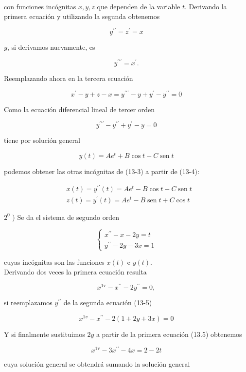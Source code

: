 \documentclass[10pt]{article}
\theoremstyle{plain}
\theoremstyle{definition}
\theoremstyle{remark}
\begin{document}
con funciones incógnitas $x, y, z$ que dependen de la variable $t$. Derivando la primera ecuación y utilizando la segunda obtenemos


\begin{equation*}
y^{\prime \prime}=z^{\prime}=x \tag{13-4}
\end{equation*}


$y$, si derivamos nuevamente, es

$$
y^{\prime \prime \prime}=x^{\prime} .
$$

Reemplazando ahora en la tercera ecuación

$$
x^{\prime}-y+z-x=y^{\prime \prime \prime}-y+y^{\prime}-y^{\prime \prime}=0
$$

Como la ecuación diferencial lineal de tercer orden

$$
y^{\prime \prime \prime}-y^{\prime \prime}+y^{\prime}-y=0
$$

tiene por solución general

$$
y(t)=A e^{t}+B \cos t+C \operatorname{sen} t
$$

podemos obtener las otras incógnitas de (13-3) a partir de (13-4):

$$
\begin{aligned}
& x(t)=y^{\prime \prime}(t)=A e^{t}-B \cos t-C \operatorname{sen} t \\
& z(t)=y^{\prime}(t)=A e^{t}-B \operatorname{sen} t+C \cos t
\end{aligned}
$$

$2^{0}$ ) Se da el sistema de segundo orden

\[
\left\{\begin{array}{l}
x^{\prime \prime}-x-2 y=t  \tag{13-5}\\
y^{\prime \prime}-2 y-3 x=1
\end{array}\right.
\]

cuyas incógnitas son las funciones $x(t)$ e $y(t)$.\\
Derivando dos veces la primera ecuación resulta

$$
x^{1 \mathrm{v}}-x^{\prime \prime}-2 y^{\prime \prime}=0,
$$

si reemplazamos $y^{\prime \prime}$ de la segunda ecuación (13-5)


$$
x^{1 v}-x^{\prime \prime}-2(1+2 y+3 x)=0
$$

Y si finalmente sustituimos $2 y$ a partir de la primera ecuación (13.5) obtenemos

$$
x^{1 \mathrm{v}}-3 x^{\prime \prime}-4 x=2-2 t
$$

cuya solución general se obtendrá sumando la solución general
\end{document}
